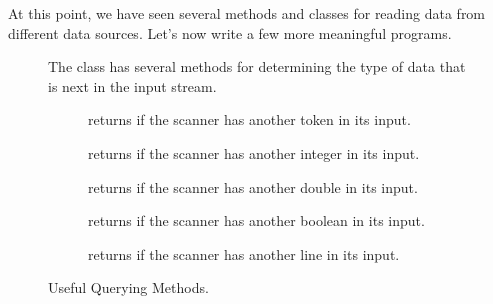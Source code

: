 At this point, we have seen several methods and classes for reading data from different data sources. 
Let's now write a few more meaningful programs.

\begin{figure}[tp]
  \small
  \begin{tcolorbox}[title=Scanner Querying Methods]
    The  class has several methods for determining the type of data that is next in the input stream.
    \vspace{2ex}
  \begin{description}
    \item [] returns  if the scanner has another token in its input.
    \item [] returns  if the scanner has another integer in its input.
    \item [] returns  if the scanner has another double in its input.
    \item [] returns  if the scanner has another boolean in its input.
    \item [] returns  if the scanner has another line in its input.
  \end{description}
\end{tcolorbox}
\caption{Useful  Querying Methods.}
\label{fig:scq}
\end{figure}


